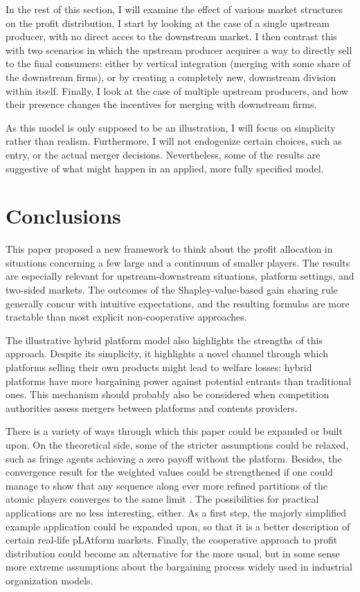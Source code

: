 \documentclass[a4paper]{article}
\begin{document}
In the rest of this section, I will examine the effect of various market structures on the profit distribution.
I start by looking at the case of a single upstream producer, with no direct acces to the downstream market.
I then contrast this with two scenarios in which the upstream producer acquires a way to directly sell to the final consumers: either by vertical integration (merging with some share of the downstream firms), or by creating a completely new, downstream division within itself.
Finally, I look at the case of multiple upstream producers, and how their presence changes the incentives for merging with downstream firms.

As this model is only supposed to be an illustration, I will focus on simplicity rather than realism.
Furthermore, I will not endogenize certain choices, such as entry, or the actual merger decisions.
Nevertheless, some of the results are suggestive of what might happen in an applied, more fully specified model.

\section{Conclusions}

This paper proposed a new framework to think about the profit allocation in situations concerning a few large and a continuum of smaller players.
The results are especially relevant for upstream-downstream situations, platform settings, and two-sided markets.
The outcomes of the Shapley-value-based gain sharing rule generally concur with intuitive expectations, and the resulting formulas are more tractable than most explicit non-cooperative approaches.

The illustrative hybrid platform model also highlights the strengths of this approach.
Despite its simplicity, it highlights a novel channel through which platforms selling their own products might lead to welfare losses: hybrid platforms have more bargaining power against potential entrants than traditional ones.
This mechanism should probably also be considered when competition authorities assess mergers between platforms and contents providers.

There is a variety of ways through which this paper could be expanded or built upon.
On the theoretical side, some of the stricter assumptions could be relaxed, such as fringe agents achieving a zero payoff without the platform.
Besides, the convergence result for the weighted values could be strengthened if one could manage to show that any sequence along ever more refined partitions of the atomic players converges to the same limit \parencite[à la][]{fogelman1980asymptotic}.
The possibilities for practical applications are no less interesting, either.
As a first step, the majorly simplified example application could be expanded upon, so that it is a better description of certain real-life pLAtform markets.
Finally, the cooperative approach to profit distribution could become an alternative for the more usual, but in some sense more extreme assumptions about the bargaining process widely used in industrial organization models.
\end{document}
